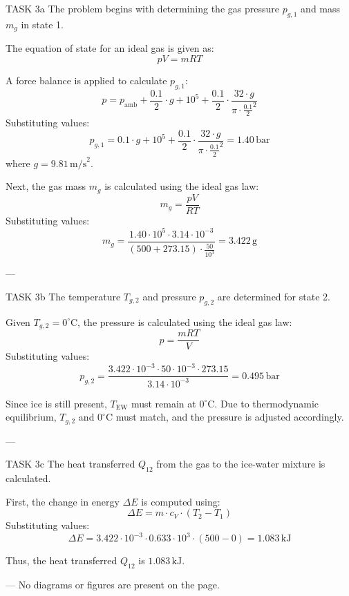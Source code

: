 TASK 3a  
The problem begins with determining the gas pressure \( p_{g,1} \) and mass \( m_g \) in state 1.  

The equation of state for an ideal gas is given as:  
\[
pV = mRT
\]  

A force balance is applied to calculate \( p_{g,1} \):  
\[
p = p_{\text{amb}} + \frac{0.1}{2} \cdot g + 10^5 + \frac{0.1}{2} \cdot \frac{32 \cdot g}{\pi \cdot \frac{0.1}{2}^2}
\]  
Substituting values:  
\[
p_{g,1} = 0.1 \cdot g + 10^5 + \frac{0.1}{2} \cdot \frac{32 \cdot g}{\pi \cdot \frac{0.1}{2}^2} = 1.40 \, \text{bar}
\]  
where \( g = 9.81 \, \text{m/s}^2 \).  

Next, the gas mass \( m_g \) is calculated using the ideal gas law:  
\[
m_g = \frac{pV}{RT}
\]  
Substituting values:  
\[
m_g = \frac{1.40 \cdot 10^5 \cdot 3.14 \cdot 10^{-3}}{(500 + 273.15) \cdot \frac{50}{10^3}} = 3.422 \, \text{g}
\]  

---

TASK 3b  
The temperature \( T_{g,2} \) and pressure \( p_{g,2} \) are determined for state 2.  

Given \( T_{g,2} = 0^\circ\text{C} \), the pressure is calculated using the ideal gas law:  
\[
p = \frac{mRT}{V}
\]  
Substituting values:  
\[
p_{g,2} = \frac{3.422 \cdot 10^{-3} \cdot 50 \cdot 10^{-3} \cdot 273.15}{3.14 \cdot 10^{-3}} = 0.495 \, \text{bar}
\]  

Since ice is still present, \( T_{\text{EW}} \) must remain at \( 0^\circ\text{C} \). Due to thermodynamic equilibrium, \( T_{g,2} \) and \( 0^\circ\text{C} \) must match, and the pressure is adjusted accordingly.  

---

TASK 3c  
The heat transferred \( Q_{12} \) from the gas to the ice-water mixture is calculated.  

First, the change in energy \( \Delta E \) is computed using:  
\[
\Delta E = m \cdot c_V \cdot (T_2 - T_1)
\]  
Substituting values:  
\[
\Delta E = 3.422 \cdot 10^{-3} \cdot 0.633 \cdot 10^3 \cdot (500 - 0) = 1.083 \, \text{kJ}
\]  

Thus, the heat transferred \( Q_{12} \) is \( 1.083 \, \text{kJ} \).  

---  
No diagrams or figures are present on the page.
